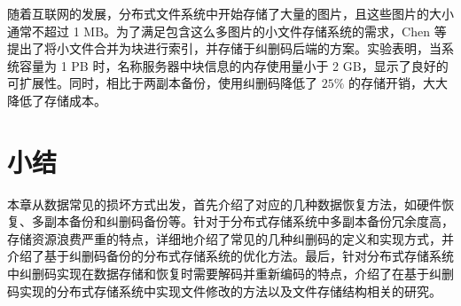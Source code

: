 随着互联网的发展，分布式文件系统中开始存储了大量的图片，且这些图片的大小通常不超过 1 MB。为了满足包含这么多图片的小文件存储系统的需求，Chen 等\cite{chen2017erasure}提出了将小文件合并为块进行索引，并存储于纠删码后端的方案。实验表明，当系统容量为 1 PB 时，名称服务器中块信息的内存使用量小于 2 GB，显示了良好的可扩展性。同时，相比于两副本备份，使用纠删码降低了 $25\%$ 的存储开销，大大降低了存储成本。
\section{小结}
本章从数据常见的损坏方式出发，首先介绍了对应的几种数据恢复方法，如硬件恢复、多副本备份和纠删码备份等。针对于分布式存储系统中多副本备份冗余度高，存储资源浪费严重的特点，详细地介绍了常见的几种纠删码的定义和实现方式，并介绍了基于纠删码备份的分布式存储系统的优化方法。最后，针对分布式存储系统中纠删码实现在数据存储和恢复时需要解码并重新编码的特点，介绍了在基于纠删码实现的分布式存储系统中实现文件修改的方法以及文件存储结构相关的研究。
